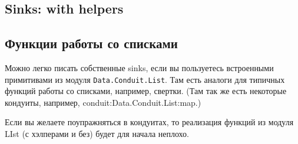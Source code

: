 \subsection{Sinks: with helpers}
% 
% 
%
\subsection{Функции работы со списками}

Можно легко писать собственные sinks, если вы пользуетесь встроенными примитивами из
модуля \verb*|Data.Conduit.List|. Там есть аналоги для типичных функций работы со
списками, например, свертки. (Там так же есть некоторые кондуиты,
например, conduit:Data.Conduit.List:map.)

Если вы желаете поупражняться в кондуитах, то реализация функций из модуля LIst (с
хэлперами и без) будет для начала неплохо.

